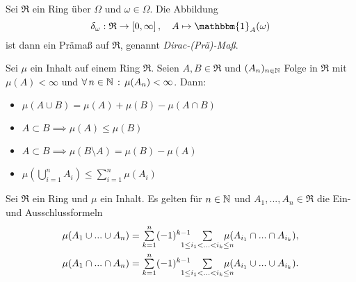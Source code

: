 \documentclass{cheat-sheet}
\newcommand{\Ring}{\mathfrak{R}} %
\newcommand{\ind}{\mathbbm{1}} %
\begin{document}
\begin{bsp}
  Sei $\Ring$ ein Ring über $\Omega$ und $\omega \in \Omega$. Die Abbildung
  \[ \delta_{\omega} : \Ring \to \cinterval{0}{\infty}, \quad A \mapsto \ind_A(\omega) \]
  ist dann ein Prämaß auf $\Ring$, genannt \emph{Dirac-(Prä)-Maß}.
\end{bsp}

\begin{lem}
  Sei $\mu$ ein Inhalt auf einem Ring $\Ring$. Seien $A, B \in \Ring$ und $(A_n)_{n \in \mathbb{N}}$ Folge in $\Ring$ mit $\mu(A) < \infty$ und $\forall \, {n \in \mathbb{N}} \,:\, \mu(A_n) < \infty$. Dann:
  \begin{itemize}
    \item $\mu(A \cup B) = \mu(A) + \mu(B) - \mu(A \cap B)$
    \item $A \subset B \implies \mu(A) \leq \mu(B)$ 
    \item $A \subset B \implies \mu(B \setminus A) = \mu(B) - \mu(A)$
    \item $\mu(\bigcup_{i=1}^n A_i) \leq \sum_{i=1}^n \mu(A_i)$ 
  \end{itemize}
\end{lem}

\begin{satz}
  Sei $\Ring$ ein Ring und $\mu$ ein Inhalt. Es gelten für $n \in \mathbb{N}$ und $A_1, ..., A_n \in \Ring$ die Ein- und Ausschlussformeln
  \begin{align*}
    \mu(A_1 \cup ... \cup A_n) &= \sum_{k=1}^n (-1)^{k-1} \quad \sum_{\mathclap{1 \leq i_1 < ... < i_k \leq n}} \quad \mu(A_{i_1} \cap ... \cap A_{i_k}), \\
    \mu(A_1 \cap ... \cap A_n) &= \sum_{k=1}^n (-1)^{k-1} \quad \sum_{\mathclap{1 \leq i_1 < ... < i_k \leq n}} \quad \mu(A_{i_1} \cup ... \cup A_{i_k}).
  \end{align*}
\end{satz}
\end{document}
